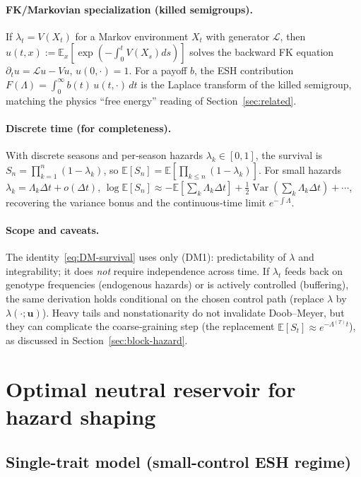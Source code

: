 \documentclass[11pt]{article}
\theoremstyle{upright}
\newcommand{\E}{\mathbb{E}}
\newcommand{\Var}{\operatorname{Var}}
\newcommand{\hazT}[1]{\Lambda^{(#1)}}          %
\begin{document}
\paragraph{FK/Markovian specialization (killed semigroups).}
If $\lambda_t=V(X_t)$ for a Markov environment $X_t$ with generator $\mathcal L$, then
$u(t,x):=\E_x[\exp(-\int_0^t V(X_s)ds)]$ solves the backward FK equation $\partial_t u=\mathcal L u - V u$, $u(0,\cdot)=1$.
For a payoff $b$, the ESH contribution $F(\Lambda)=\int_0^\infty b(t)\,u(t,\cdot)\,dt$ is the Laplace transform
of the killed semigroup, matching the physics “free energy” reading of Section~\ref{sec:related}.

\paragraph{Discrete time (for completeness).}
With discrete seasons and per‑season hazards $\lambda_k\in[0,1]$, the survival is
$S_n=\prod_{k=1}^n (1-\lambda_k)$, so $\E[S_n]=\E[\prod_{k\le n}(1-\lambda_k)]$.
For small hazards $\lambda_k=\Lambda_k\Delta t+o(\Delta t)$,
$\log \E[S_n]\approx -\E[\sum_k \Lambda_k \Delta t] + \tfrac12\Var(\sum_k\Lambda_k\Delta t)+\cdots$,
recovering the variance bonus and the continuous‑time limit $e^{-\int \Lambda}$.

\paragraph{Scope and caveats.}
The identity~\eqref{eq:DM-survival} uses only (DM1): predictability of $\lambda$ and integrability; it does \emph{not} require independence across time. If $\lambda_t$ feeds back on genotype frequencies (endogenous hazards) or is actively controlled (buffering), the same derivation holds conditional on the chosen control path (replace $\lambda$ by $\lambda(\cdot;\mathbf u)$). Heavy tails and nonstationarity do not invalidate Doob--Meyer, but they can complicate the coarse‑graining step (the replacement $\E[S_t]\approx e^{-\hazT{T} t}$), as discussed in Section~\ref{sec:block-hazard}.

\section{Optimal neutral reservoir for hazard shaping}
\label{sec:optimal-reservoir}

\subsection{Single-trait model (small-control ESH regime)}
\end{document}
